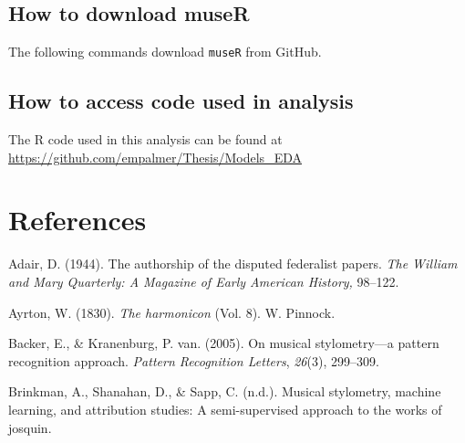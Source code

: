 \documentclass[12pt,twoside]{reedthesis}
\theoremstyle{definition}
\theoremstyle{definition}
\theoremstyle{definition}
\theoremstyle{remark}
\begin{document}
\section*{How to download museR}\label{how-to-download-muser}

The following commands download \texttt{museR} from GitHub.
\begin{Shaded}
\begin{Highlighting}[]
\NormalTok{(}\NormalTok{)}
\end{Highlighting}
\end{Shaded}
\section*{How to access code used in
analysis}\label{how-to-access-code-used-in-analysis}

The R code used in this analysis can be found at
\url{https://github.com/empalmer/Thesis/Models_EDA}

\backmatter

\chapter*{References}\label{references}


\noindent

\setlength{\parindent}{-0.20in} \setlength{\leftskip}{0.20in}
\setlength{\parskip}{8pt}

\hypertarget{refs}{}
\hypertarget{ref-adair1944}{}
Adair, D. (1944). The authorship of the disputed federalist papers.
\emph{The William and Mary Quarterly: A Magazine of Early American
History,} 98--122.

\hypertarget{ref-harmonicon}{}
Ayrton, W. (1830). \emph{The harmonicon} (Vol. 8). W. Pinnock.

\hypertarget{ref-backer2005}{}
Backer, E., \& Kranenburg, P. van. (2005). On musical stylometry---a
pattern recognition approach. \emph{Pattern Recognition Letters},
\emph{26}(3), 299--309.

\hypertarget{ref-brinkman2016}{}
Brinkman, A., Shanahan, D., \& Sapp, C. (n.d.). Musical stylometry,
machine learning, and attribution studies: A semi-supervised approach to
the works of josquin.
\end{document}
